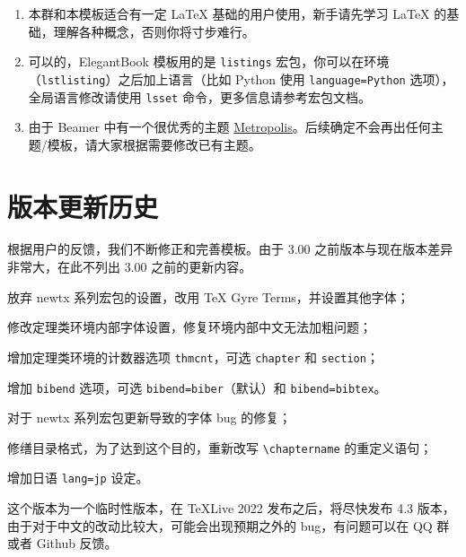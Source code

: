 \documentclass[lang=cn,10pt]{elegantbook}
\begin{document}
\begin{enumerate}[itemsep=1.5ex]
  \item {}
    本群和本模板适合有一定 \LaTeX{} 基础的用户使用，新手请先学习 \LaTeX{} 的基础，理解各种概念，否则你将寸步难行。
  \item {}
    可以的，ElegantBook 模板用的是 \lstinline{listings} 宏包，你可以在环境（\lstinline{lstlisting}）之后加上语言（比如 Python 使用 \lstinline{language=Python} 选项），全局语言修改请使用 \lstinline{lsset} 命令，更多信息请参考宏包文档。
  \item {}
    由于 Beamer 中有一个很优秀的主题 \href{https://github.com/matze/mtheme}{Metropolis}。后续确定不会再出任何主题/模板，请大家根据需要修改已有主题。
\end{enumerate}

\chapter{版本更新历史}

根据用户的反馈，我们不断修正和完善模板。由于 3.00 之前版本与现在版本差异非常大，在此不列出 3.00 之前的更新内容。



\begin{change}
  \item 放弃 newtx 系列宏包的设置，改用 TeX Gyre Terms，并设置其他字体；
  \item 修改定理类环境内部字体设置，修复环境内部中文无法加粗问题；
  \item 增加定理类环境的计数器选项 \lstinline{thmcnt}，可选 \lstinline{chapter} 和 \lstinline{section}；
  \item 增加 \lstinline{bibend} 选项，可选 \lstinline{bibend=biber}（默认）和 \lstinline{bibend=bibtex}。
\end{change}




\begin{change}
  \item 对于 newtx 系列宏包更新导致的字体 bug 的修复；
  \item 修缮目录格式，为了达到这个目的，重新改写 \lstinline{\chaptername} 的重定义语句；
  \item 增加日语 \lstinline{lang=jp} 设定。
  \item 这个版本为一个临时性版本，在 \TeX Live 2022 发布之后，将尽快发布 4.3 版本，由于对于中文的改动比较大，可能会出现预期之外的 bug，有问题可以在 QQ 群或者 Github 反馈。
\end{change}
\end{document}

